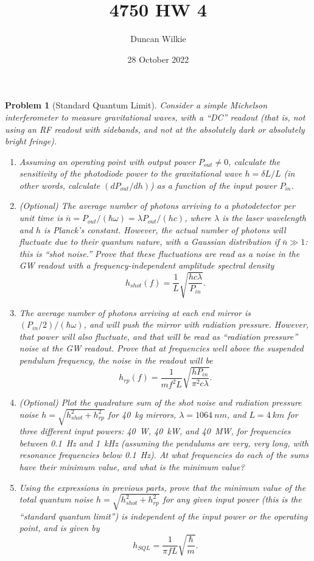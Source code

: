\documentclass{article}
\title{4750 HW 4}
\author{Duncan Wilkie}
\date{28 October 2022}
\newtheorem{plm}{Problem}
\begin{document}
\maketitle

\begin{plm}[Standard Quantum Limit]
  Consider a simple Michelson interferometer to measure gravitational waves, with a ``DC'' readout (that is, not using an RF readout with sidebands,
  and not at the absolutely dark or absolutely bright fringe).
  \begin{enumerate}
  \item Assuming an operating point with output power $P_{out} \neq 0$, calculate the sensitivity of the photodiode power to the gravitational wave
    $h = \delta L / L$ (in other words, calculate $(dP_{out}/dh)$) as a function of the input power $P_{in}$.
  \item (Optional) The average number of photons arriving to a photodetector per unit time is $\bar{n} = P_{out} / (\hbar\omega) = \lambda P_{out} / (hc)$,
    where $\lambda$ is the laser wavelength and $h$ is Planck's constant.
    However, the actual number of photons will fluctuate due to their quantum nature, with a Gaussian distribution if $\bar{n}\gg 1$: this is ``shot noise.''
    Prove that these fluctuations are read as a noise in the GW readout with a frequency-independent amplitude spectral density
    \[
      h_{shot}(f) = \frac{1}{L}\sqrt{\frac{hc\lambda}{P_{in}}}.
    \]
  \item The average number of photons arriving at each end mirror is $(P_{in} / 2)/(\hbar\omega)$, and will push the mirror with radiation pressure.
    However, that power will also fluctuate, and that will be read as ``radiation pressure'' noise at the GW readout.
    Prove that at frequencies well above the suspended pendulum frequency, the noise in the readout will be
    \[
      h_{rp}(f) = \frac{1}{mf^{2}L}\sqrt{\frac{hP_{in}}{\pi^{2}c\lambda}}.
    \]
  \item (Optional) Plot the quadrature sum of the shot noise and radiation pressure noise $h = \sqrt{h_{shot}^{2} + h_{rp}^{2}}$ for \SI{40}{kg} mirrors,
    $\lambda = \SI{1064}{nm}$, and $L = \SI{4}{km}$ for three different input powers: \SI{40}{W}, \SI{40}{kW}, and \SI{40}{MW},
    for frequencies between \SI{0.1}{Hz} and \SI{1}{kHz} (assuming the pendulums are very, very long, with resonance frequencies below \SI{0.1}{Hz}).
    At what frequencies do each of the sums have their minimum value, and what is the minimum value?
  \item Using the expressions in previous parts, prove that the minimum value of the total quantum noise $h = \sqrt{h_{shot}^{2} + h_{rp}^{2}}$
    for any given input power (this is the ``standard quantum limit'') is independent of the input power or the operating point, and is given by
    \[
      h_{SQL} = \frac{1}{\pi fL}\sqrt{\frac{\hbar}{m}}.
    \]
  \end{enumerate}
\end{plm}
\end{document}
